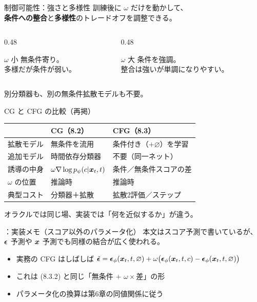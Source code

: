 \asmain
\begin{frame}{制御可能性：強さと多様性}
    訓練後に $\omega$ だけを動かして、\\
    \textbf{条件への整合}と\textbf{多様性}のトレードオフを調整できる。
    \begin{columns}[T,onlytextwidth]
        \begin{column}{0.48\textwidth}
            \begin{block}{$\omega$ 小}
                無条件寄り。\\
                多様だが条件が弱い。
            \end{block}
        \end{column}
        \begin{column}{0.48\textwidth}
            \begin{block}{$\omega$ 大}
                条件を強調。\\
                整合は強いが単調になりやすい。
            \end{block}
        \end{column}
    \end{columns}
    \vfill
    別分類器も、別の無条件拡散モデルも不要。
\end{frame}
\asmain
\begin{frame}{CG と CFG の比較（再掲）}
    \renewcommand{\arraystretch}{1.2}
    \footnotesize
    \begin{tabular}{lll}
        & \textbf{CG（8.2）} & \textbf{CFG（8.3）} \\
        \hline
        拡散モデル & 無条件を流用 & 条件付き（$+\varnothing$）を学習 \\
        追加モデル & 時間依存分類器 & 不要（同一ネット） \\
        誘導の中身 & $\omega\nabla\log p_\psi(c|\bm{x}_t,t)$ & 条件／無条件スコアの差 \\
        $\omega$ の位置 & 推論時 & 推論時 \\
        典型コスト & 分類器＋拡散 & 拡散2評価／ステップ \\
    \end{tabular}
    \normalsize
    \vfill
    オラクルでは同じ場、実装では「何を近似するか」が違う。
\end{frame}
\assuppl
\begin{frame}{\supplmark：実装メモ（スコア以外のパラメータ化）}
    本文はスコア予測で書いているが、\\
    $\bm{\epsilon}$ 予測や $\bm{x}$ 予測でも同様の結合が広く使われる。
    \begin{itemize}
        \item 実務の CFG はしばしば
        $\tilde{\bm{\epsilon}}=\bm{\epsilon}_\phi(\bm{x}_t,t,\varnothing)+\omega\bigl(\bm{\epsilon}_\phi(\bm{x}_t,t,c)-\bm{\epsilon}_\phi(\bm{x}_t,t,\varnothing)\bigr)$
        \item これは (8.3.2) と同じ「無条件 $+$ $\omega\times$差」の形
        \item パラメータ化の換算は第6章の同値関係に従う
    \end{itemize}
\end{frame}
